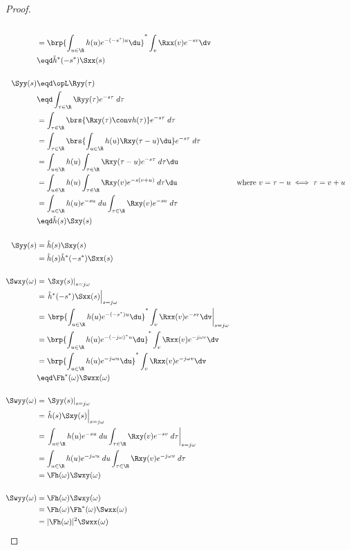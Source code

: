 \begin{proof}
\begin{align*}
   \\&=    \brp{\int_{u\in\R}h(u) e^{-(-s^\ast)u} \du }^\ast
           \int_v \Rxx(v)e^{-sv} \dv
   \\&\eqd \hat{h}^\ast(-s^\ast) \Sxx(s)
\\
\\
   \Syy(s)
     &\eqd \opL \Ryy(\tau)
   \\&\eqd \int_{\tau\in\R}\Ryy(\tau) e^{-s\tau} \; d\tau
   \\&=    \int_{\tau\in\R}\brs{ \Rxy(\tau) \conv h(\tau) } e^{-s\tau} \; d\tau
   \\&=    \int_{\tau\in\R}\brs{ \int_{u\in\R}h(u) \Rxy(\tau-u)\du } e^{-s\tau} \; d\tau
   \\&=    \int_{u\in\R}h(u) \int_{\tau\in\R}\Rxy(\tau-u) e^{-s\tau} \; d\tau\du
   \\&=    \int_{u\in\R}h(u) \int_{\tau\in\R}\Rxy(v) e^{-s(v+u)} \; d\tau\du
     && \text{where $v=\tau-u\iff \tau=v+u$}
   \\&=    \int_{u\in\R}h(u)e^{-su} \;du \int_{\tau\in\R}\Rxy(v) e^{-sv} \; d\tau
   \\&\eqd \hat{h}(s) \Sxy(s)
\\
\\
   \Syy(s)
     &= \hat{h}(s) \Sxy(s)
   \\&= \hat{h}(s) \hat{h}^\ast(-s^\ast) \Sxx(s)
\\
\\
   \Swxy(\omega)
     &=    \left.\Sxy(s)\right|_{s=j\omega}
   \\&=    \left. \hat{h}^\ast(-s^\ast) \Sxx(s)\right|_{s=j\omega}
   \\&=    \left.
           \brp{\int_{u\in\R}h(u) e^{-(-s^\ast)u} \du }^\ast
           \int_v \Rxx(v)e^{-sv} \dv
           \right|_{s=j\omega}
   \\&=    \brp{\int_{u\in\R}h(u) e^{-(-j\omega)^\ast u} \du }^\ast
           \int_v \Rxx(v)e^{-j\omega v} \dv
   \\&=    \brp{\int_{u\in\R}h(u) e^{-j\omega u} \du }^\ast
           \int_v \Rxx(v)e^{-j\omega v} \dv
   \\&\eqd \Fh^\ast(\omega) \Swxx(\omega)
\\
\\
   \Swyy(\omega)
     &=    \left.\Syy(s)\right|_{s=j\omega}
   \\&=    \left. \hat{h}(s) \Sxy(s) \right|_{s=j\omega}
   \\&=    \left. \int_{u\in\R}h(u)e^{-su} \;du \int_{\tau\in\R}\Rxy(v) e^{-sv} \; d\tau\right|_{s=j\omega}
   \\&=    \int_{u\in\R}h(u)e^{-j\omega u} \;du \int_{\tau\in\R}\Rxy(v) e^{-j\omega v} \; d\tau
   \\&=    \Fh(\omega) \Swxy(\omega)
\\
\\
  \Swyy(\omega)
     &=    \Fh(\omega)\Swxy(\omega)
   \\&=    \Fh(\omega) \Fh^\ast(\omega) \Swxx(\omega)
   \\&=    |\Fh(\omega)|^2 \Swxx(\omega)
\end{align*}


\end{proof}


